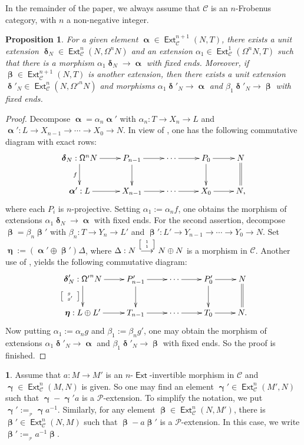\documentclass[11pt,a4paper]{amsart}
\newcommand{\rt}{\rightarrow}
\newcommand{\lrt}{\longrightarrow}
\newcommand{\st}{\stackrel}
\newcommand{\C}{\mathscr{C} }
\newcommand{\p}{\mathfrak{p} }
\def\Ext{\operatorname{{\mathsf{Ext}}}}
\def\syz{\mathsf{\Omega}}
\def\p{\mathcal P}
\def\al{\operatorname{\boldsymbol{\alpha}}}
\def\be{\operatorname{\boldsymbol{\beta}}}
\def\ga{\operatorname{\boldsymbol{\gamma}}}
\def\de{\operatorname{\boldsymbol{\delta}}}
\def\et{\operatorname{\boldsymbol{\eta}}}
\newtheorem{prop}[theorem]{Proposition}
\theoremstyle{definition}
\newtheorem{s}[theorem]{}
\theoremstyle{plain}
\theoremstyle{definition}
\numberwithin{equation}{section}
\begin{document}
In the remainder of the paper, we always assume that $\C$ is an $n$-Frobenus category, with $n$ a non-negative integer.

\begin{prop}\label{ll}For a given element  $\al\in\Ext^{n+1}_{\C}(N, T)$, there exists a unit extension $\de_N\in\Ext^n_{\C}(N, \syz^nN)$ and an extension $\alpha_1\in\Ext^1_{\C}(\syz^nN, T)$ such that there is a morphism $\alpha_1\de_N\rt\al$ with fixed ends. Moreover, if $\be\in\Ext^{n+1}_{\C}(N, T)$ is another extension, then there exists a unit extension $\de'_N\in\Ext^n_{\C}(N, {\syz'}^nN)$ and morphisms $\alpha_1\de'_N\rt\al$ and $\beta_1\de'_N\rt\be$ with fixed ends.
\end{prop}
\begin{proof}Decompose $\al=\alpha_n\al'$ with $\alpha_n: T\rt X_n\rt L$ and $\al': L\rt X_{n-1}\rt\cdots\rt X_0\rt N$. In view of \cite[Lemma 5.2(2)]{bfss},   one has the following commutative diagram with exact rows:
{\footnotesize\[\xymatrix{\de_N:{\syz}^{n}N\ar[d]_{f}\ar[r] & P_{n-1}\ar[d]\ar[r] & \cdots\ar[r] & P_0\ar[r]\ar[d] & N\ar@{=}[d]\\ \al':L\ar[r] & X_{n-1}\ar[r] & \cdots\ar[r] & X_0\ar[r] & N,}\]}where each $P_i$ is $n$-projective. Setting $\alpha_1:=\alpha_nf$, one obtains the morphism of extensions $\alpha_1\de_N\lrt\al$ with fixed ends. For the second assertion, decompose $\be=\beta_n\be'$ with $\beta_n:T\rt Y_n\rt L'$ and $\be': L'\rt Y_{n-1}\rt\cdots\rt Y_0\rt N$. Set $\et:=(\al'\oplus\be')\Delta$, where $\Delta:N\st{{{\tiny {\left[\begin{array}{ll} 1 \\ 1 \end{array} \right]}}}}\lrt N\oplus N$ is a morphism in $\C$. Another use of \cite[Lemma 5.2(2)]{bfss}, yields the following commutative diagram:
{\footnotesize\[\xymatrix{\de'_N:{\syz'}^{n}N\ar[d]_{{{{\tiny {\left[\begin{array}{ll} g \\ g' \end{array} \right]}}}}}\ar[r] & P'_{n-1}\ar[d]\ar[r] & \cdots\ar[r] & P'_0\ar[r]\ar[d] & N\ar@{=}[d]\\ \et:L\oplus L'\ar[r] & T_{n-1}\ar[r] & \cdots\ar[r] & T_0\ar[r] & N.}\]}Now putting $\alpha_1:=\alpha_ng$ and $\beta_1:=\beta_ng'$, one may obtain the morphism of extensions $\alpha_1\de'_N\lrt\al$ and $\beta_1\de'_N\lrt\be$ with fixed ends. So the proof is finished.
\end{proof}

\begin{s}Assume that $a:M\rt M'$ is an $n$-$\Ext$-invertible morphism in $\C$ and $\ga\in\Ext^n_{\C}(M, N)$ is given. So  one may find an element $\ga'\in\Ext^n_{\C}(M', N)$ such that $\ga-\ga'a$ is a $\p$-extension. To simplify the notation, we put $\ga':=_{_{\p}}\ga a^{-1}$. Similarly, for any element $\be\in\Ext^n_{\C}(N, M')$, there is  $\be'\in\Ext^n_{\C}(N, M)$ such that $\be -a\be'$ is a $\p$-extension. In this case, we write $\be':=_{_{\p}}a^{-1}\be$.
\end{s}
\end{document}
